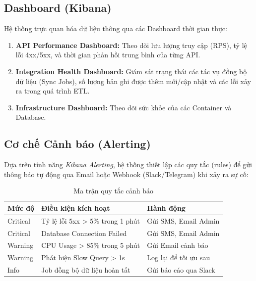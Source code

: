 \subsection{Dashboard (Kibana)}
Hệ thống trực quan hóa dữ liệu thông qua các Dashboard thời gian thực:
\begin{enumerate}
    \item \textbf{API Performance Dashboard:} Theo dõi lưu lượng truy cập (RPS), tỷ lệ lỗi 4xx/5xx, và thời gian phản hồi trung bình của từng API.
    \item \textbf{Integration Health Dashboard:} Giám sát trạng thái các tác vụ đồng bộ dữ liệu (Sync Jobs), số lượng bản ghi được thêm mới/cập nhật và các lỗi xảy ra trong quá trình ETL.
    \item \textbf{Infrastructure Dashboard:} Theo dõi sức khỏe của các Container và Database.
\end{enumerate}

\subsection{Cơ chế Cảnh báo (Alerting)}
Dựa trên tính năng \textit{Kibana Alerting}, hệ thống thiết lập các quy tắc (rules) để gửi thông báo tự động qua Email hoặc Webhook (Slack/Telegram) khi xảy ra sự cố:

\begin{table}[h]
\centering
\begin{tabular}{|l|p{6cm}|p{4cm}|}
\hline
\textbf{Mức độ} & \textbf{Điều kiện kích hoạt} & \textbf{Hành động} \\
\hline
Critical & Tỷ lệ lỗi 5xx > 5\% trong 1 phút & Gửi SMS, Email Admin \\
\hline
Critical & Database Connection Failed & Gửi SMS, Email Admin \\
\hline
Warning & CPU Usage > 85\% trong 5 phút & Gửi Email cảnh báo \\
\hline
Warning & Phát hiện Slow Query > 1s & Log lại để tối ưu sau \\
\hline
Info & Job đồng bộ dữ liệu hoàn tất & Gửi báo cáo qua Slack \\
\hline
\end{tabular}
\caption{Ma trận quy tắc cảnh báo}
\end{table}